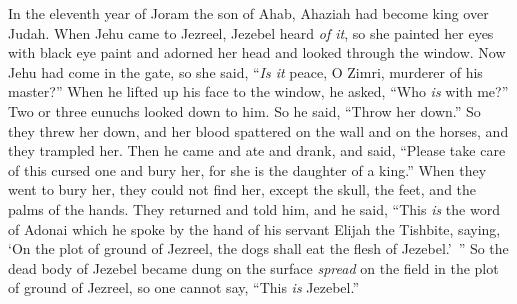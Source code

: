 \begin{biblechapter}
\verse In the eleventh year of Joram the son of Ahab, Ahaziah had become king over Judah.
 When Jehu came to Jezreel, Jezebel heard \textit{of it}, so she painted her eyes with black eye paint and adorned her head and looked through the window.
\verse Now Jehu had come in the gate, so she said, “\textit{Is it} peace, O Zimri, murderer of his master?”
\verse When he lifted up his face to the window, he asked, “Who \textit{is} with me?” Two or three eunuchs looked down to him.
\verse So he said, “Throw her down.” So they threw her down, and her blood spattered on the wall and on the horses, and they trampled her.
\verse Then he came and ate and drank, and said, “Please take care of this cursed one and bury her, for she is the daughter of a king.”
\verse When they went to bury her, they could not find her, except the skull, the feet, and the palms of the hands.
\verse They returned and told him, and he said, “This \textit{is} the word of Adonai which he spoke by the hand of his servant Elijah the Tishbite, saying, ‘On the plot of ground of Jezreel, the dogs shall eat the flesh of Jezebel.’ ”
\verse So the dead body of Jezebel became dung on the surface \textit{spread} on the field in the plot of ground of Jezreel, so one cannot say, “This \textit{is} Jezebel.”
\end{biblechapter}

